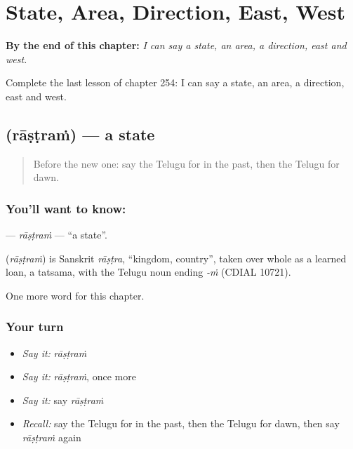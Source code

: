 
\chapter{State, Area, Direction, East, West}
\label{ch:te-state-area-direction-east-west}

\begin{chapteropening}
\textbf{By the end of this chapter:} \emph{I can say a state, an area, a direction, east and west.}

Complete the last lesson of chapter 254: I can say a state, an area, a direction, east and west.
\end{chapteropening}

\section[\texorpdfstring{\te{రాష్ట్రం} (rāṣṭraṁ)}{రాష్ట్రం (rāṣṭraṁ)}]{ (rāṣṭraṁ) — a state}

\label{lesson:TE-C254-rastram}



\begin{quote}
Before the new one: say the Telugu for in the past, then the Telugu for dawn.
\end{quote}

\subsection*{You'll want to know: }
\textbf{} — \emph{rāṣṭraṁ} — \textquotedblleft{}a state\textquotedblright{}.

\begin{cousinweb}
\textbf{} (\emph{rāṣṭraṁ}) is Sanskrit \emph{rāṣṭra}, \textquotedblleft{}kingdom, country\textquotedblright{}, taken over whole as a learned loan, a tatsama, with the Telugu noun ending \emph{-ṁ} (CDIAL 10721).
\end{cousinweb}

\begin{grammarlens}[title={What you've built}]
One more word for this chapter.
\end{grammarlens}

\subsection*{Your turn}
\begin{itemize}
\raggedright
  \item \emph{Say it:} \emph{rāṣṭraṁ}
  \item \emph{Say it:} \emph{rāṣṭraṁ}, once more
  \item \emph{Say it:} say \emph{rāṣṭraṁ}
  \item \emph{Recall:} say the Telugu for in the past, then the Telugu for dawn, then say \emph{rāṣṭraṁ} again
\end{itemize}

